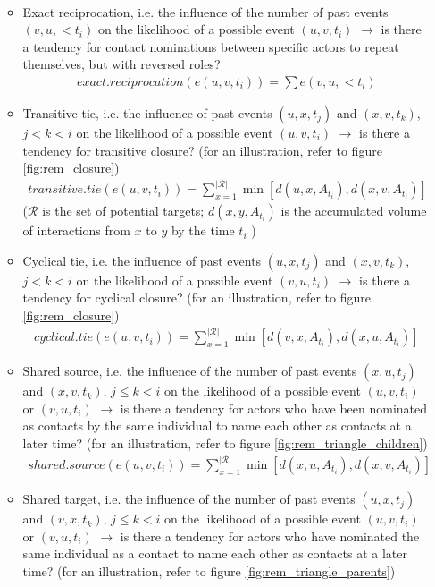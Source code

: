 \begin{itemize}
\begin{itemize}
\begin{align*}
		\end{align*}
		\item Exact reciprocation, i.e. the influence of the number of past events $(v,u,<t_i)$ on the likelihood of a possible event $(u,v,t_i)$ $\rightarrow$ is there a tendency for contact nominations between specific actors to repeat themselves, but with reversed roles?
		\begin{align*}
			exact.reciprocation(e(u,v,t_i)) = \sum e(v,u,<t_i)
		\end{align*}
		\item Transitive tie, i.e. the influence of past events $(u,x,t_j)$ and $(x,v,t_k)$, $j < k < i$ on the likelihood of a possible event $(u,v,t_i)$ $\rightarrow$ is there a tendency for transitive closure? (for an illustration, refer to figure \ref{fig:rem_closure})
		\begin{align*}
			transitive.tie(e(u,v,t_i)) = \sum_{x=1}^{\lvert \mathcal{R} \rvert} \min [d(u,x,A_{t_i}), d(x,v,A_{t_i})]
		\end{align*}
		($\mathcal{R}$ is the set of potential targets; $d(x,y,A_{t_i})$ is the accumulated volume of interactions from $x$ to $y$ by the time $t_i$ \cite{butts20084})
		\item Cyclical tie, i.e. the influence of past events $(u,x,t_j)$ and $(x,v,t_k)$, $j < k < i$ on the likelihood of a possible event $(v,u,t_i)$ $\rightarrow$ is there a tendency for cyclical closure? (for an illustration, refer to figure \ref{fig:rem_closure})
		\begin{align*}
			cyclical.tie(e(u,v,t_i)) = \sum_{x=1}^{\lvert \mathcal{R} \rvert} \min [d(v,x,A_{t_i}), d(x,u,A_{t_i})]
		\end{align*}
		\item Shared source, i.e. the influence of the number of past events $(x,u,t_j)$ and $(x,v,t_k)$, $j \leq k < i$ on the likelihood of a possible event $(u,v,t_i)$ or $(v,u,t_i)$ $\rightarrow$ is there a tendency for actors who have been nominated as contacts by the same individual to name each other as contacts at a later time? (for an illustration, refer to figure \ref{fig:rem_triangle_children})
		\begin{align*}
			shared.source(e(u,v,t_i)) = \sum_{x=1}^{\lvert \mathcal{R} \rvert} \min [d(x,u,A_{t_i}), d(x,v,A_{t_i})]
		\end{align*}
		\item Shared target, i.e. the influence of the number of past events $(u,x,t_j)$ and $(v,x,t_k)$, $j \leq k < i$ on the likelihood of a possible event $(u,v,t_i)$ or $(v,u,t_i)$ $\rightarrow$ is there a tendency for actors who have nominated the same individual as a contact to name each other as contacts at a later time? (for an illustration, refer to figure \ref{fig:rem_triangle_parents})

\end{itemize}
\end{itemize}
